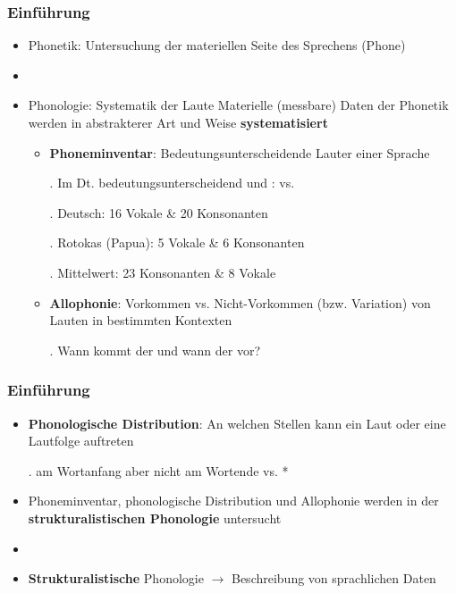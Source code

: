 \begin{frame}
\frametitle{Einführung}

\begin{itemize}
	\item Phonetik: Untersuchung der materiellen Seite des Sprechens (Phone)
	\item[]
	\item Phonologie: Systematik der Laute \ras Materielle (messbare) Daten der Phonetik werden in abstrakterer Art und Weise \textbf{systematisiert}
	
	\begin{itemize}
		\item \textbf{Phoneminventar}: Bedeutungsunterscheidende Lauter einer Sprache 

		\ex. Im Dt. bedeutungsunterscheidend \textipa{[v]} und \textipa{[f]}: \textipa{[v\t{aI}n]} vs. \textipa{[f\t{aI}n]}
		
		\ex. Deutsch: 16 Vokale \& 20 Konsonanten
		
		\ex. Rotokas (Papua): 5 Vokale \& 6 Konsonanten
		
		\ex. Mittelwert: 23 Konsonanten \& 8 Vokale

		\item \textbf{Allophonie}: Vorkommen vs. Nicht-Vorkommen (bzw. Variation) von Lauten in bestimmten Kontexten

		\ex. Wann kommt der  und wann der  vor?

	\end{itemize}
	
\end{itemize}
		
\end{frame}




\begin{frame}
\frametitle{Einführung}

\begin{itemize}
	\item \textbf{Phonologische Distribution}: An welchen Stellen kann ein Laut oder eine Lautfolge auftreten

	\ex. \textipa{[St\;R]} am Wortanfang aber nicht am Wortende \textipa{[St\;R\t{aU}x]} vs. *

	\item Phoneminventar, phonologische Distribution und Allophonie werden in der \textbf{strukturalistischen Phonologie} untersucht
	\item[]
	\item \textbf{Strukturalistische} Phonologie $\rightarrow$ Beschreibung von sprachlichen Daten 

\end{itemize}

\end{frame}


